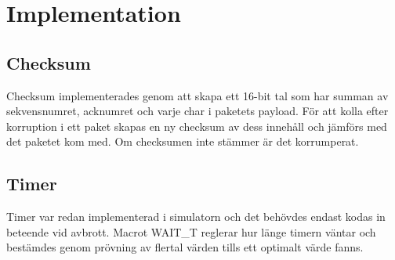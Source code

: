\section{Implementation}
\subsection{Checksum}
Checksum implementerades genom att skapa ett 16-bit tal som har summan av sekvensnumret, acknumret och varje char i paketets payload. För att kolla efter korruption i ett paket skapas en ny checksum av dess innehåll och jämförs med det paketet kom med. Om checksumen inte stämmer är det korrumperat. 
\subsection{Timer}
Timer var redan implementerad i simulatorn och det behövdes endast kodas in beteende vid avbrott. Macrot WAIT\_T reglerar hur länge timern väntar och bestämdes genom prövning av flertal värden tills ett optimalt värde fanns.
